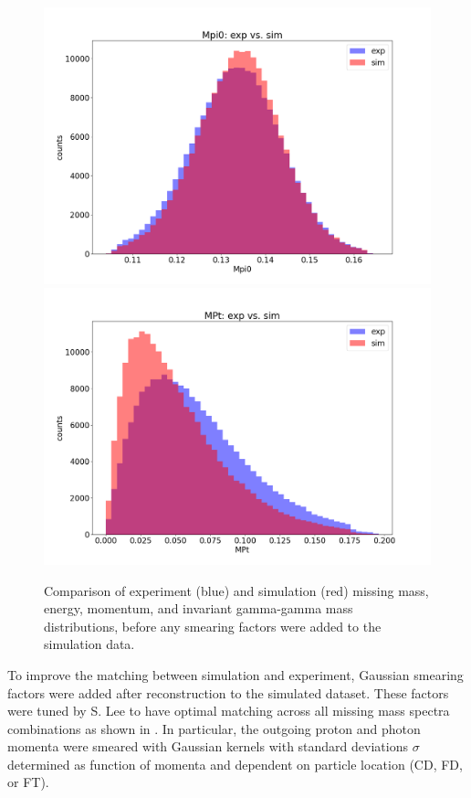 \begin{figure}[hbt]
	\includegraphics[page=133,width=0.3\linewidth]{Chapters/Ch4-BaseAnalysis/0_preprocessing/0_B_simulation_data_preprocessing/pics/nosmear/outbending_rad_All_All_All_no_smearingMpi0_exp_vs_sim.png}
	\includegraphics[page=135,width=0.3\linewidth]{Chapters/Ch4-BaseAnalysis/0_preprocessing/0_B_simulation_data_preprocessing/pics/nosmear/outbending_rad_All_All_All_no_smearingMPt_exp_vs_sim.png}
	
	\caption[Simulation and Experiment Matching before Smearing]{Comparison of experiment (blue) and simulation (red) missing mass, energy, momentum, and invariant gamma-gamma mass distributions, before any smearing factors were added to the simulation data.}
	\label{fig:bad}
\end{figure}


To improve the matching between simulation and experiment, Gaussian smearing factors were added after reconstruction to the simulated dataset. These factors were tuned by S. Lee \parencite{Lee2022MeasurementDetector} to have optimal matching across all missing mass spectra combinations as shown in . In particular, the outgoing proton and photon momenta were smeared with Gaussian kernels with standard deviations $\sigma$ determined as function of momenta and dependent on particle location (CD, FD, or FT).

